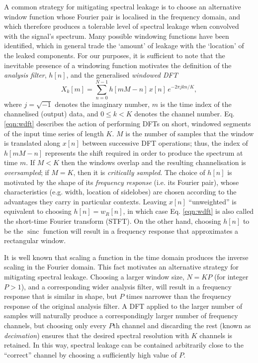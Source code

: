 \documentclass{pasa}%
\DeclareMathOperator{\sinc}{sinc}
\begin{document}
A common strategy for mitigating spectral leakage is to choose an alternative window function whose Fourier pair is localised in the frequency domain, and which therefore produces a tolerable level of spectral leakage when convolved with the signal's spectrum.
Many possible windowing functions have been identified, which in general trade the `amount' of leakage with the `location' of the leaked components.
For our purposes, it is sufficient to note that the inevitable presence of a windowing function motivates the definition of the \textit{analysis filter}, $h[n]$, and the generalised \textit{windowed DFT}
\begin{equation}
    X_k[m] = \sum_{n=0}^{N-1} h[mM - n]\,x[n]\,e^{-2\pi jkn/K},
    \label{eqn:wdft}
\end{equation}
where $j = \sqrt{-1}$ denotes the imaginary number, $m$ is the time index of the channelised (output) data, and $0 \le k < K$ denotes the channel number.
Eq. \eqref{eqn:wdft} describes the action of performing DFTs on short, windowed segments of the input time series of length $K$.
$M$ is the number of samples that the window is translated along $x[n]$ between successive DFT operations; thus, the index of $h[mM - n]$ represents the shift required in order to produce the spectrum at time $m$.
If $M < K$ then the windows overlap and the resulting channelisation is \textit{oversampled}; if $M = K$, then it is \textit{critically sampled}.
The choice of $h[n]$ is motivated by the shape of its \textit{frequency response} (i.e. its Fourier pair), whose characteristics (e.g. width, location of sidelobes) are chosen according to the advantages they carry in particular contexts.
Leaving $x[n]$ ``unweighted'' is equivalent to choosing $h[n] = w_R[n]$, in which case Eq. \eqref{eqn:wdft} is also called the short-time Fourier transform (STFT).
On the other hand, choosing $h[n]$ to be the $\sinc$ function will result in a frequency response that approximates a rectangular window.

It is well known that scaling a function in the time domain produces the inverse scaling in the Fourier domain.
This fact motivates an alternative strategy for mitigating spectral leakage.
Choosing a larger window size, $N = KP$ (for integer $P > 1$), and a corresponding wider analysis filter, will result in a frequency response that is similar in shape, but $P$ times narrower than the frequency response of the original analysis filter.
A DFT applied to the larger number of samples will naturally produce a correspondingly larger number of frequency channels, but choosing only every $P$th channel and discarding the rest (known as \textit{decimation}) ensures that the desired spectral resolution with $K$ channels is retained.
In this way, spectral leakage can be contained arbitrarily close to the ``correct'' channel by choosing a sufficiently high value of $P$.
\end{document}
